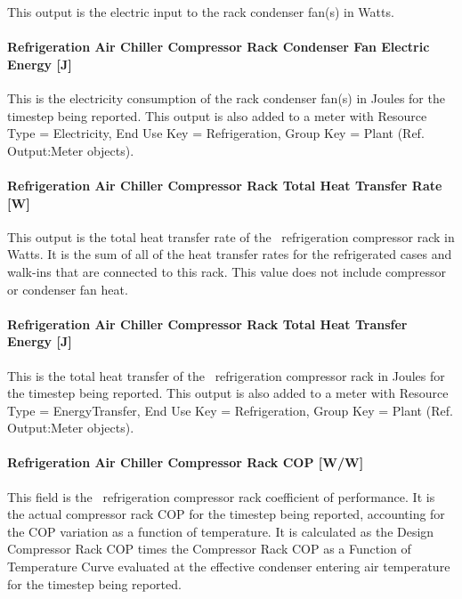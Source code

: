 This output is the electric input to the rack condenser fan(s) in Watts.

\paragraph{Refrigeration Air Chiller Compressor Rack Condenser Fan Electric Energy {[}J{]}}\label{refrigeration-air-chiller-compressor-rack-condenser-fan-electric-energy-j}

This is the electricity consumption of the rack condenser fan(s) in Joules for the timestep being reported. This output is also added to a meter with Resource Type = Electricity, End Use Key = Refrigeration, Group Key = Plant (Ref. Output:Meter objects).

\paragraph{Refrigeration Air Chiller Compressor Rack Total Heat Transfer Rate {[}W{]}}\label{refrigeration-air-chiller-compressor-rack-total-heat-transfer-rate-w}

This output is the total heat transfer rate of the ~refrigeration compressor rack in Watts. It is the sum of all of the heat transfer rates for the refrigerated cases and walk-ins that are connected to this rack. This value does not include compressor or condenser fan heat.

\paragraph{Refrigeration Air Chiller Compressor Rack Total Heat Transfer Energy {[}J{]}}\label{refrigeration-air-chiller-compressor-rack-total-heat-transfer-energy-j}

This is the total heat transfer of the~ refrigeration compressor rack in Joules for the timestep being reported. This output is also added to a meter with Resource Type = EnergyTransfer, End Use Key = Refrigeration, Group Key = Plant (Ref. Output:Meter objects).

\paragraph{Refrigeration Air Chiller Compressor Rack COP {[}W/W{]}}\label{refrigeration-air-chiller-compressor-rack-cop-ww}

This field is the~ refrigeration compressor rack coefficient of performance. It is the actual compressor rack COP for the timestep being reported, accounting for the COP variation as a function of temperature. It is calculated as the Design Compressor Rack COP times the Compressor Rack COP as a Function of Temperature Curve evaluated at the effective condenser entering air temperature for the timestep being reported.

